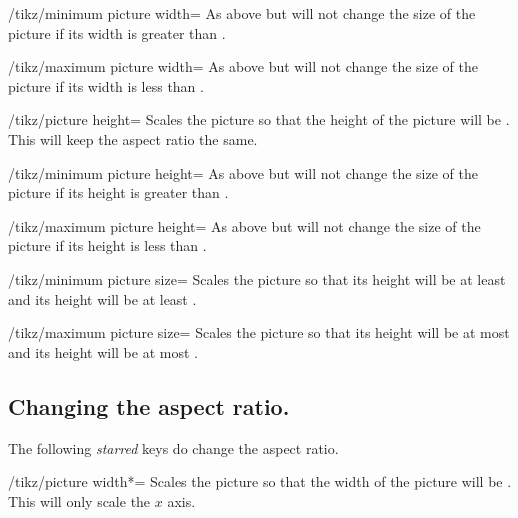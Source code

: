 \begin{multicols}{2}
\begin{key}{/tikz/minimum picture width=}
  As above but will not change the size of the picture
  if its width is greater than .
\end{key}

\begin{key}{/tikz/maximum picture width=}
  As above but will not change the size of the picture
  if its width is less than .
\end{key}

\begin{key}{/tikz/picture height=}
  Scales the picture so that the height of the picture will be .
  This will keep the aspect ratio the same.
\end{key}

\begin{key}{/tikz/minimum picture height=}
  As above but will not change the size of the picture
  if its height is greater than .
\end{key}

\begin{key}{/tikz/maximum picture height=}
  As above but will not change the size of the picture
  if its height is less than .
\end{key}

\begin{key}{/tikz/minimum picture size=}
  Scales the picture so that its height will be at least 
  and its height will be at least .
\end{key}

\begin{key}{/tikz/maximum picture size=}
  Scales the picture so that its height will be at most 
  and its height will be at most .
\end{key}

\subsection{Changing the aspect ratio.}
The following \emph{starred} keys do change the aspect ratio.
\begin{key}{/tikz/picture width*=}
  Scales the picture so that the width of the picture will be .
  This will only scale the $x$ axis.
\end{key}


\end{multicols}
